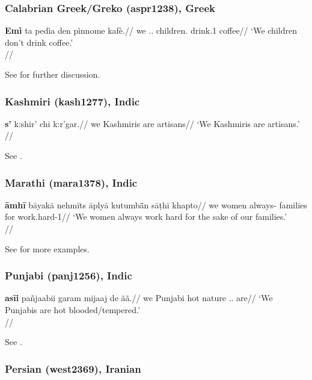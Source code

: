 \documentclass[A4paper]{article}
\begin{document}
\subsubsection{Calabrian Greek/Greko (aspr1238), Greek}

\ex
\begingl
\gla \textbf{Emì} ta pedìa den pìnnome kafè.//
\glb we \Det.\N.\Pl{} children.\N{} \Neg{} drink.1\Pl{} coffee//
\glft `We children don't drink coffee.'\\\citep[after][274, (17)]{hoehnetalICGLcalabria}//
\endgl
\xe

See \citet{hoehnetalICGLcalabria} for further discussion.

\subsubsection{Kashmiri (kash1277), Indic}

\ex 
\begingl
\gla \textbf{\textschwa{}s'} k\textschwa{}:shir' chi k\textschwa{}:r'gar.//
\glb we Kashmiris are artisans//
\glft `We Kashmiris are artisans.'\\\citep[200, (8)]{walikoul1997}//
\endgl
\xe

See \citet[200]{walikoul1997}.

\subsubsection{Marathi (mara1378), Indic}

\ex \begingl
\gla \textbf{\={a}mh\={i}} b\={a}yak\={a} nehm\={i}ts \={a}ply\={a} kutumb\={ã}n s\={a}\d{t}h\={i} khapto//
\glb we women always-\Emph{} \Refl{} families for {work.hard-1\Pl}//
\glft `We women always work hard for the sake of our families.'\\\citep[386, (1141)]{pandharipande1997}//
\endgl
\xe

See \citet[381, 386]{pandharipande1997} for more examples.


\subsubsection{Punjabi (panj1256), Indic}

\ex
\begingl
\gla \textbf{as\={ii}} pañjaabii garam mijaaj de ãã.//
\glb we Punjabi hot nature \Gen.\M.\Pl{} are//
\glft `We Punjabis are hot blooded/tempered.'\\\citep[228, (703)]{bhatia1993}//
\endgl
\xe

See \citet[228]{bhatia1993}.

\subsubsection{Persian (west2369), Iranian}
\end{document}
